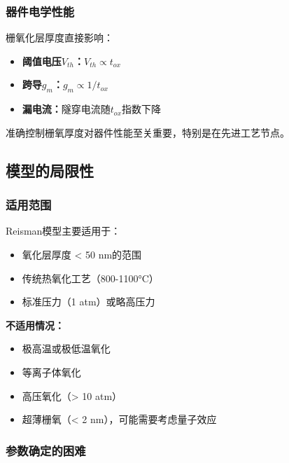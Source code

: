 \documentclass[UTF8,12pt,a4paper]{ctexart}
\begin{document}
\subsubsection{器件电学性能}

栅氧化层厚度直接影响：
\begin{itemize}
    \item \textbf{阈值电压$V_{th}$：}$V_{th} \propto t_{ox}$
    \item \textbf{跨导$g_m$：}$g_m \propto 1/t_{ox}$
    \item \textbf{漏电流：}隧穿电流随$t_{ox}$指数下降
\end{itemize}

准确控制栅氧厚度对器件性能至关重要，特别是在先进工艺节点。

\subsection{模型的局限性}

\subsubsection{适用范围}

Reisman模型主要适用于：
\begin{itemize}
    \item 氧化层厚度 < 50 nm的范围
    \item 传统热氧化工艺（800-1100°C）
    \item 标准压力（1 atm）或略高压力
\end{itemize}

\textbf{不适用情况：}
\begin{itemize}
    \item 极高温或极低温氧化
    \item 等离子体氧化
    \item 高压氧化（> 10 atm）
    \item 超薄栅氧（< 2 nm），可能需要考虑量子效应
\end{itemize}

\subsubsection{参数确定的困难}
\end{document}
